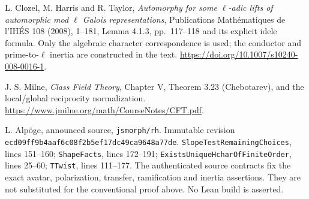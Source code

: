 L. Clozel, M. Harris and R. Taylor,
\emph{Automorphy for some $\ell$-adic lifts of automorphic mod $\ell$
Galois representations}, Publications Math\'ematiques de l'IH\'ES
108 (2008), 1--181, Lemma 4.1.3, pp.~117--118 and its explicit
idele formula.  Only the algebraic character correspondence is used;
the conductor and prime-to-$\ell$ inertia are constructed in the text.
\url{https://doi.org/10.1007/s10240-008-0016-1}.

J. S. Milne, \emph{Class Field Theory}, Chapter V, Theorem 3.23
(Chebotarev), and the local/global reciprocity normalization.
\url{https://www.jmilne.org/math/CourseNotes/CFT.pdf}.

L. Alp\"oge, announced source, \texttt{jsmorph/rh}.\newline
Immutable revision
\texttt{ecd09ff9b4aaf6c08f2b5ef17dc49ca9648a77de}.
\texttt{SlopeTestRemainingChoices}, lines 151--160;
\texttt{ShapeFacts}, lines 172--191;
\texttt{ExistsUniqueHcharOfFiniteOrder}, lines 25--60;
\texttt{TTwist}, lines 111--177.
The authenticated source contracts fix the exact avatar, polarization,
transfer, ramification and inertia assertions.  They are not substituted
for the conventional proof above.  No Lean build is asserted.
